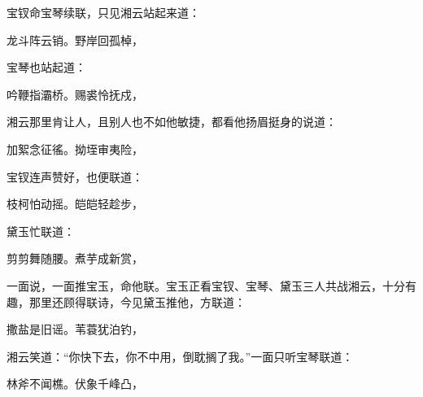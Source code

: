 \begin{parag}
    宝钗命宝琴续联，只见湘云站起来道：
\end{parag}
\begin{poem}
    \begin{pl} 龙斗阵云销。野岸回孤棹，\end{pl}
\end{poem}
\begin{parag}
    宝琴也站起道：
\end{parag}
\begin{poem}
    \begin{pl} 吟鞭指灞桥。赐裘怜抚戍，\end{pl}
\end{poem}
\begin{parag}
    湘云那里肯让人，且别人也不如他敏捷，都看他扬眉挺身的说道：
\end{parag}
\begin{poem}
    \begin{pl} 加絮念征徭。拗垤审夷险，\end{pl}
\end{poem}
\begin{parag}
    宝钗连声赞好，也便联道：
\end{parag}
\begin{poem}
    \begin{pl} 枝柯怕动摇。皑皑轻趁步，\end{pl}
\end{poem}
\begin{parag}
    黛玉忙联道：
\end{parag}
\begin{poem}
    \begin{pl} 剪剪舞随腰。煮芋成新赏，\end{pl}
\end{poem}
\begin{parag}
    一面说，一面推宝玉，命他联。宝玉正看宝钗、宝琴、黛玉三人共战湘云，十分有趣，那里还顾得联诗，今见黛玉推他，方联道：
\end{parag}
\begin{poem}
    \begin{pl} 撒盐是旧谣。苇蓑犹泊钓，\end{pl}
\end{poem}
\begin{parag}
    湘云笑道：“你快下去，你不中用，倒耽搁了我。”一面只听宝琴联道：
\end{parag}
\begin{poem}
    \begin{pl} 林斧不闻樵。伏象千峰凸，\end{pl}
\end{poem}
